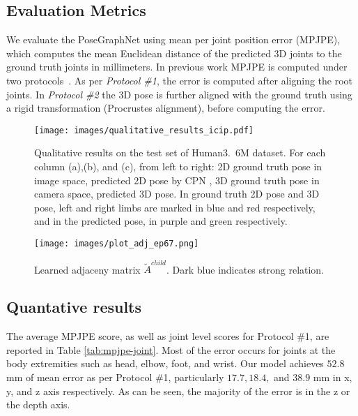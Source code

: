 \documentclass{article}
\begin{document}
\subsection{Evaluation Metrics}
We evaluate the PoseGraphNet using mean per joint position error (MPJPE), which computes the mean Euclidean distance of the predicted 3D joints to the ground truth joints in millimeters.
In previous work MPJPE is computed under two protocols~\cite{Martinez2017,Cai2019,Zhao2019}.
As per \textit{Protocol \#1}, the error is computed after aligning the root joints. 
In \textit{Protocol \#2} the 3D pose is further aligned with the ground truth using a rigid transformation (Procrustes alignment), before computing the error.

\begin{figure*}[t]
\begin{center}
\texttt{[image: images/qualitative\_results\_icip.pdf]}
\end{center}
   \caption{Qualitative results on the test set of Human3.~6M dataset. For each column (a),(b), and (c), from left to right: 2D ground truth pose in image space, predicted 2D pose by CPN \cite{Chen2018}, 3D ground truth pose in camera space, predicted 3D pose. In ground truth 2D pose and 3D pose, left and right limbs are marked in blue and red respectively, and in the predicted pose, in purple and green respectively.}   
\label{fig:sample_results}
\end{figure*}

\begin{figure}[t]
\begin{center}
\texttt{[image: images/plot\_adj\_ep67.png]}
\end{center}
   \caption{Learned adjaceny matrix $\tilde{A}^{child}$. Dark blue indicates strong relation.}   
\label{fig:adj}
\end{figure}

\subsection{Quantative results}
The average MPJPE score, as well as joint level scores for Protocol \#1, are reported in Table \ref{tab:mpjpe-joint}. 
Most of the error occurs for joints at the body extremities such as head, elbow, foot, and wrist. 
Our model achieves $52.8$ mm of mean error as per Protocol \#1, particularly $17.7, 18.4,$ and $38.9$ mm in x, y, and z axis respectively. 
As can be seen, the majority of the error is in the z or the depth axis.
\end{document}
